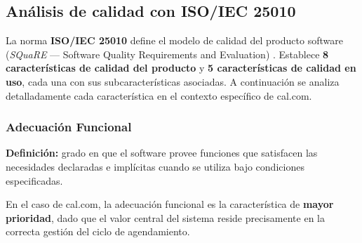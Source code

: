 \documentclass[12pt, a4paper]{article}
\begin{document}
\subsection{Análisis de calidad con ISO/IEC 25010}

La norma \textbf{ISO/IEC 25010} \parencite{iso25010} define el modelo de calidad del producto software
(\textit{SQuaRE} — Software Quality Requirements and Evaluation) \parencite{pressman2020}. Establece \textbf{8
características de calidad del producto} y \textbf{5 características de calidad en uso},
cada una con sus subcaracterísticas asociadas. A continuación se analiza detalladamente
cada característica en el contexto específico de cal.com.

\subsubsection{Adecuación Funcional}

\textbf{Definición:} grado en que el software provee funciones que satisfacen las
necesidades declaradas e implícitas cuando se utiliza bajo condiciones especificadas.

En el caso de cal.com, la adecuación funcional es la característica de \textbf{mayor
prioridad}, dado que el valor central del sistema reside precisamente en la correcta
gestión del ciclo de agendamiento.
\end{document}

